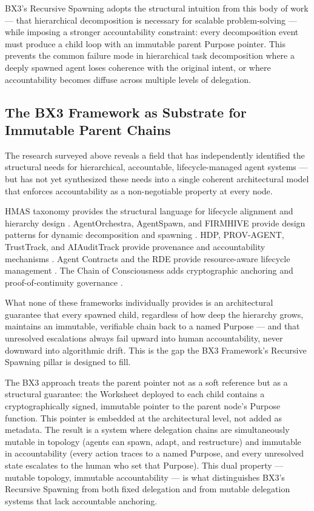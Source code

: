 BX3's Recursive Spawning adopts the structural intuition from this body of work — that hierarchical decomposition is necessary for scalable problem-solving — while imposing a stronger accountability constraint: every decomposition event must produce a child loop with an immutable parent Purpose pointer. This prevents the common failure mode in hierarchical task decomposition where a deeply spawned agent loses coherence with the original intent, or where accountability becomes diffuse across multiple levels of delegation.

\subsection{The BX3 Framework as Substrate for Immutable Parent Chains}

The research surveyed above reveals a field that has independently identified the structural needs for hierarchical, accountable, lifecycle-managed agent systems — but has not yet synthesized these needs into a single coherent architectural model that enforces accountability as a non-negotiable property at every node.

HMAS taxonomy provides the structural language for lifecycle alignment and hierarchy design \cite{moore2025hmas}. AgentOrchestra, AgentSpawn, and FIRMHIVE provide design patterns for dynamic decomposition and spawning \cite{agentorchestra2025, agentspawn2025, firmhive2025}. HDP, PROV-AGENT, TrustTrack, and AIAuditTrack provide provenance and accountability mechanisms \cite{hdp2026, hdp2025ietf, provcagent2025, trusttrack2025, aaudittrack2025}. Agent Contracts and the RDE provide resource-aware lifecycle management \cite{agentcontracts2025, rde2025}. The Chain of Consciousness adds cryptographic anchoring and proof-of-continuity governance \cite{chainofconsciousness2026}.

What none of these frameworks individually provides is an architectural guarantee that every spawned child, regardless of how deep the hierarchy grows, maintains an immutable, verifiable chain back to a named Purpose — and that unresolved escalations always fail upward into human accountability, never downward into algorithmic drift. This is the gap the BX3 Framework's Recursive Spawning pillar is designed to fill.

The BX3 approach treats the parent pointer not as a soft reference but as a structural guarantee: the Worksheet deployed to each child contains a cryptographically signed, immutable pointer to the parent node's Purpose function. This pointer is embedded at the architectural level, not added as metadata. The result is a system where delegation chains are simultaneously mutable in topology (agents can spawn, adapt, and restructure) and immutable in accountability (every action traces to a named Purpose, and every unresolved state escalates to the human who set that Purpose). This dual property — mutable topology, immutable accountability — is what distinguishes BX3's Recursive Spawning from both fixed delegation and from mutable delegation systems that lack accountable anchoring.

